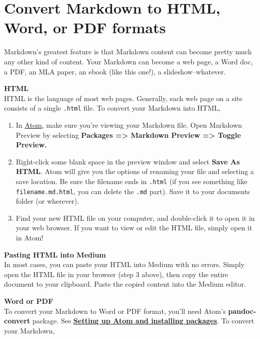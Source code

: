 \documentclass[]{book}
\providecommand{\tightlist}{%
  \setlength{\itemsep}{0pt}\setlength{\parskip}{0pt}}
\theoremstyle{definition}
\theoremstyle{definition}
\theoremstyle{definition}
\theoremstyle{remark}
\begin{document}
\hypertarget{convert-markdown-to-html-word-or-pdf-formats}{%
\section{Convert Markdown to HTML, Word, or PDF
formats}\label{convert-markdown-to-html-word-or-pdf-formats}}

Markdown's greatest feature is that Markdown content can become pretty
much any other kind of content. Your Markdown can become a web page, a
Word doc, a PDF, an MLA paper, an ebook (like this one!), a
slideshow--whatever.

\textbf{HTML}\\
HTML is the language of most web pages. Generally, each web page on a
site consists of a single \texttt{.html} file. To convert your Markdown
into HTML,

\begin{enumerate}
\def\labelenumi{\arabic{enumi}.}
\tightlist
\item
  In \href{https://andylaut.github.io/3844-guidebook/atom.htm}{Atom},
  make sure you're viewing your Markdown file. Open Markdown Preview by
  selecting \textbf{Packages =\textgreater{} Markdown Preview
  =\textgreater{} Toggle Preview.}
\item
  Right-click some blank space in the preview window and select
  \textbf{Save As HTML}. Atom will give you the options of renaming your
  file and selecting a save location. Be sure the filename ends in
  \texttt{.html} (if you see something like \texttt{filename.md.html},
  you can delete the \texttt{.md} part). Save it to your documents
  folder (or wherever).
\item
  Find your new HTML file on your computer, and double-click it to open
  it in your web browser. If you want to view or edit the HTML file,
  simply open it in Atom!
\end{enumerate}

\textbf{Pasting HTML into Medium}\\
In most cases, you can paste your HTML into Medium with no errors.
Simply open the HTML file in your browser (step 3 above), then copy the
entire document to your clipboard. Paste the copied content into the
Medium editor.

\textbf{Word or PDF}\\
To convert your Markdown to Word or PDF format, you'll need Atom's
\textbf{pandoc-convert} package. See
\href{https://andylaut.github.io/3844-guidebook/atom.html\#setting-up-atom-and-installing-packages}{\textbf{Setting
up Atom and installing packages}}. To convert your Markdown,
\end{document}
